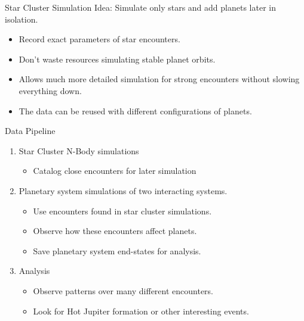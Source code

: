 \documentclass{beamer}
\begin{document}
\begin{frame}{Star Cluster Simulation}
    Idea: Simulate only stars and add planets later in isolation.
    \begin{itemize}
        \item Record exact parameters of star encounters.
        \item Don't waste resources simulating stable planet orbits.
        \item Allows much more detailed simulation for strong encounters
            without slowing everything down.
        \item The data can be reused with different configurations of planets.
    \end{itemize}
\end{frame}

\begin{frame}{Data Pipeline}
    \begin{enumerate}
        \item Star Cluster N-Body simulations
            \begin{itemize}
                \item Catalog close encounters for later simulation
            \end{itemize}
        \item Planetary system simulations of two interacting systems.
            \begin{itemize}
                \item Use encounters found in star cluster simulations.
                \item Observe how these encounters affect planets.
                \item Save planetary system end-states for analysis.
            \end{itemize}
        \item Analysis 
            \begin{itemize}
                \item Observe patterns over many different encounters.
                \item Look for Hot Jupiter formation or other interesting events.
            \end{itemize}
    \end{enumerate}
\end{frame}
\end{document}
